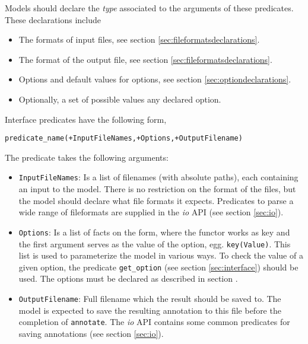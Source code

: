 \documentclass{book}
\begin{document}
Models should declare the \emph{type} associated to the arguments of
these predicates. These declarations include
\begin{itemize}
\item The formats of input files, see section
  \ref{sec:fileformatsdeclarations}.
\item The format of the output file, see section
  \ref{sec:fileformatsdeclarations}.
\item Options and default values for options, see section
  \ref{sec:optiondeclarations}.
\item Optionally, a set of possible values any declared option.
\end{itemize}


Interface predicates have the following form,

\begin{verbatim}
predicate_name(+InputFileNames,+Options,+OutputFilename)
\end{verbatim}

The predicate takes the following arguments:
\begin{itemize}

\item \texttt{InputFileNames}: Is a list of filenames (with absolute paths),
  each containing an input to the model. 
  There is no restriction on the format of the files, but the model
  should declare what file formats it expects.
  Predicates to parse a wide range of fileformats are supplied 
  in the \emph{io} API (see section \ref{sec:io}). 

\item \texttt{Options}: Is a list of facts on the form, where the functor
  works as key and the first argument serves as the value of the
  option, egg. \texttt{key(Value)}. This list is used to parameterize the model
  in various ways. To check the value of a given option, the predicate
  \texttt{get\_option} (see section \ref{sec:interface}) should be used.
  The options must be declared as described in section
  \label{sec:optiondeclarations}.

\item \texttt{OutputFilename}: Full filename which the result should be saved to. The model is expected to save
  the resulting annotation to this file before the completion of 
  \texttt{annotate}. The \emph{io} API contains some
  common predicates for saving annotations (see section \ref{sec:io}).
\end{itemize}
\end{document}
